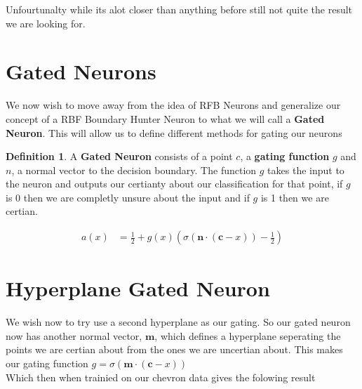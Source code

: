 \documentclass{article}
\theoremstyle{definition}
\newtheorem{definition}{Definition}[section]
\begin{document}
Unfourtunalty while its alot closer than anything before still not quite the result we are looking for.

\newpage

\section{Gated Neurons}
We now wish to move away from the idea of RFB Neurons and generalize our concept of a RBF Boundary Hunter Neuron to what we will call a \textbf{Gated Neuron}. This will allow us to define different methods for gating our neurons

\theoremstyle{definition}
\begin{definition}
A \textbf{Gated Neuron} consists of a point $c$, a \textbf{gating function} $g$ and $n$, a normal vector to the decision boundary. The function $g$ takes the input to the neuron and outputs our certianty about our classification for that point, if $g$ is 0 then we are completly unsure about the input and if $g$ is 1 then we are certian.

\begin{align}
a(x) &= \frac{1}{2} + g(x) (\sigma(\mathbf{n} \cdot (\mathbf{c} - x)) - \frac{1}{2})
\end{align}

\end{definition}

\section{Hyperplane Gated Neuron}
We wish now to try use a second hyperplane as our gating. So our gated neuron now has another normal vector, $\mathbf{m}$, which defines a hyperplane seperating the points we are certian about from the ones we are uncertian about. This makes our gating function $g = \sigma(\mathbf{m} \cdot (\mathbf{c} - x))$\\

Which then when trainied on our chevron data gives the folowing result
\end{document}
